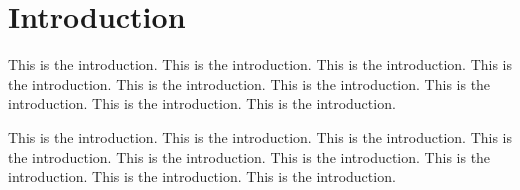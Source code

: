 \chapter{Introduction}


This is the introduction.  This is the introduction.  This is the introduction.
This is the introduction.  This is the introduction.  This is the introduction.
This is the introduction.  This is the introduction.  This is the introduction.

This is the introduction.  This is the introduction.  This is the introduction.
This is the introduction.  This is the introduction.  This is the introduction.
This is the introduction.  This is the introduction.  This is the introduction.
